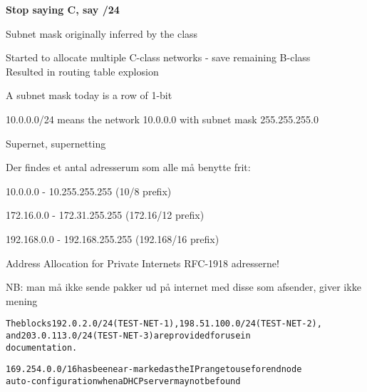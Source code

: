 \documentclass[Screen16to9,17pt]{foils}
\begin{document}
\vskip 5mm
\centerline{\bf Stop saying C, say /24}



\begin{list1}
\item Subnet mask originally inferred by the class
\item Started to allocate multiple C-class networks - save remaining B-class\\
Resulted in routing table explosion
\item A subnet mask today is a row of 1-bit
\item 10.0.0.0/24 means the network 10.0.0.0 with subnet mask 255.255.255.0
\item Supernet, supernetting
\end{list1}



\begin{list1}
\item Der findes et antal adresserum som alle må benytte frit:
\begin{list2}
\item 10.0.0.0    -  10.255.255.255  (10/8 prefix)
\item 172.16.0.0  -  172.31.255.255  (172.16/12 prefix)
\item 192.168.0.0 -  192.168.255.255 (192.168/16 prefix)
\end{list2}
\item Address Allocation for Private Internets RFC-1918 adresserne!
\item NB: man må ikke sende pakker ud på internet med disse som afsender, giver ikke mening
\end{list1}

\begin{alltt}
The blocks 192.0.2.0/24 (TEST-NET-1), 198.51.100.0/24 (TEST-NET-2),
and 203.0.113.0/24 (TEST-NET-3) are provided for use in
documentation.

169.254.0.0/16 has been ear-marked as the IP range to use for end node
auto-configuration when a DHCP server may not be found
\end{alltt}




\end{document}
